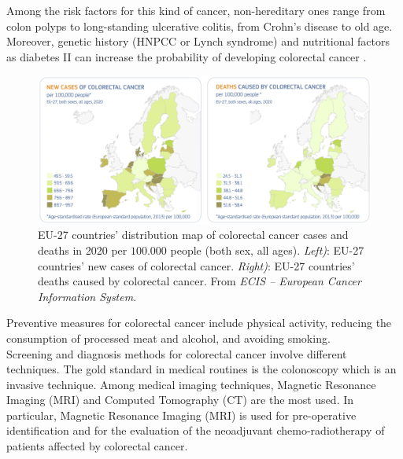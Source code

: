 \documentclass{standalone}
\begin{document}
Among the risk factors for this kind of cancer, non-hereditary ones range from colon polyps to long-standing ulcerative colitis, from Crohn's disease to old age. 
Moreover, genetic history (HNPCC or Lynch syndrome) and nutritional factors as diabetes II can increase the probability of developing colorectal cancer \cite{tesicoppola}.
\\
\begin{figure}[!ht]
	\centering
	\includegraphics[width=\linewidth]{../images/distribmap.png}
	\caption{ EU-27 countries' distribution map of colorectal cancer cases and deaths in 2020 per $100.000$ people (both sex, all ages). \textit{Left)}: EU-27 countries' new cases of colorectal cancer. \textit{Right)}: EU-27 countries' deaths caused by colorectal cancer. From \textit{ECIS – European Cancer Information System}\cite{eucancerstats}.}
\end{figure}

Preventive measures for colorectal cancer include physical activity, reducing the consumption of processed meat and alcohol, and avoiding smoking\cite{stats2019}.
\\
Screening and diagnosis methods for colorectal cancer involve different techniques. 
The gold standard in medical routines is the colonoscopy which is an invasive technique\cite{jovana}.
Among medical imaging techniques, Magnetic Resonance Imaging (MRI) and Computed Tomography (CT) are the most used\cite{tesicoppola}. 
In particular, Magnetic Resonance Imaging (MRI) is used for pre-operative identification and for the evaluation of the neoadjuvant chemo-radiotherapy of patients affected by colorectal cancer\cite{tesicoppola}.
\end{document}
